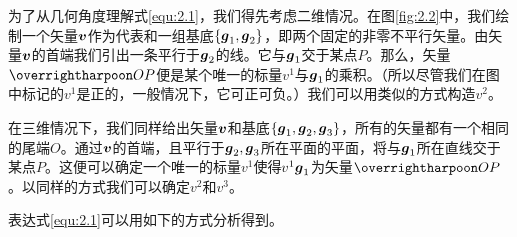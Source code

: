 为了从几何角度理解式\eqref{equ:2.1}，我们得先考虑二维情况。在图\eqref{fig:2.2}中，我们绘制一个矢量$\boldsymbol{v}$作为代表和一组基底$\left\{ \boldsymbol{g}_1,\boldsymbol{g}_2 \right\} $，即两个固定的非零不平行矢量。由矢量$\boldsymbol{v}$的首端我们引出一条平行于$\boldsymbol{g}_2$的线。它与$\boldsymbol{g}_1$交于某点$P$。那么，矢量$\rr{OP}$便是某个唯一的标量$v^1$与$\boldsymbol{g}_1$的乘积。（所以尽管我们在图中标记的$v^1$是正的，一般情况下，它可正可负。）我们可以用类似的方式构造$v^2$。

在三维情况下，我们同样给出矢量$\boldsymbol{v}$和基底$\left\{ \boldsymbol{g}_1,\boldsymbol{g}_2,\boldsymbol{g}_3 \right\} $，所有的矢量都有一个相同的尾端$O$。通过$\boldsymbol{v}$的首端，且平行于$\boldsymbol{g}_2,\boldsymbol{g}_3$所在平面的平面，将与$\boldsymbol{g}_1$所在直线交于某点$P$。这便可以确定一个唯一的标量$v^1$使得$v^1\boldsymbol{g}_1$为矢量$\rr{OP}$。以同样的方式我们可以确定$v^2$和$v^3$。

表达式\eqref{equ:2.1}可以用如下的方式分析得到。

